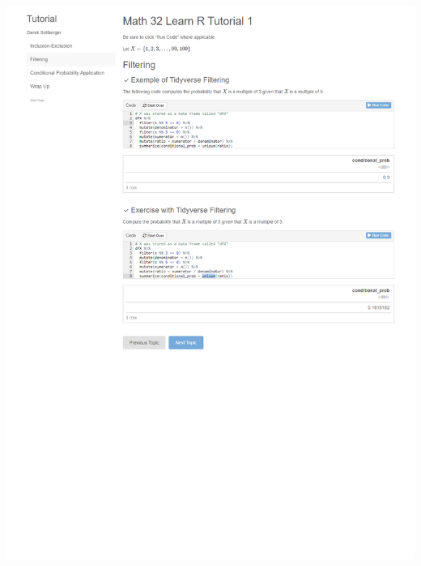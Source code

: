 \documentclass[a4paper]{article}
\begin{document}
\includegraphics[scale=0.4]{page_2.png} \\
\end{document}
